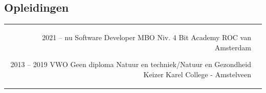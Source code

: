 \documentclass[
	10pt, %
]{FreemanCV}
\begin{document}
\begin{paracol}{2}

	\section{Opleidingen}





	\begin{supertabular}{r l} %


		\qualificationentry
		{2021 -- nu} %
		{Software Developer MBO Niv. 4} %
		{} %
		{Bit Academy} %
		{ROC van Amsterdam} %


		\qualificationentry
		{2013 -- 2019} %
		{VWO} %
		{Geen diploma} %
		{Natuur en techniek/Natuur en Gezondheid} %
		{Keizer Karel College - Amstelveen} %




	\end{supertabular}




\end{paracol}
\end{document}
